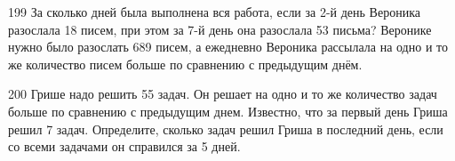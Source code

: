 \documentclass[4apaper]{article}
\begin{document}
\begin{taskBN}{199}
За сколько дней была выполнена вся работа, если за 2-й день Вероника разослала 18 писем, при этом за 7-й день она разослала 53 письма? Веронике нужно было разослать 689 писем, а ежедневно Вероника рассылала на одно и то же количество писем больше по сравнению с предыдущим днём. 
\end{taskBN}

\begin{taskBN}{200}
Грише надо решить 55 задач. Он решает на одно и то же количество задач больше по сравнению с предыдущим днем. Известно, что за первый день Гриша решил 7 задач. Определите, сколько задач решил Гриша в последний день, если со всеми задачами он справился за 5 дней.
\end{taskBN}

\newpage
 
\end{document}
